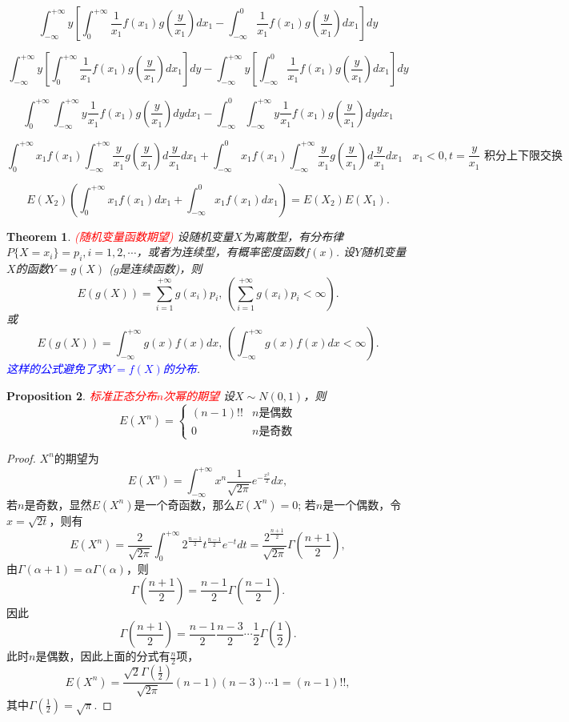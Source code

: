 \documentclass{article}
\newtheorem{theorem}{Theorem}[section]
\newtheorem{proposition}[theorem]{Proposition}
\newcommand{\redt}[1]{\textcolor{red}{#1}}
\newcommand{\bluet}[1]{\textcolor{blue}{#1}}
\begin{document}

$$
\int_{-\infty}^{+\infty}y \left[\int_0^{+\infty} \frac{1}{x_1}f(x_1)g(\frac{y}{x_1})dx_1 - \int_{-\infty}^0 \frac{1}{x_1}f(x_1)g(\frac{y}{x_1})dx_1 \right]dy
$$

$$
\int_{-\infty}^{+\infty}y \left[\int_0^{+\infty} \frac{1}{x_1}f(x_1)g(\frac{y}{x_1})dx_1\right]dy - \int_{-\infty}^{+\infty}y\left[\int_{-\infty}^0 \frac{1}{x_1}f(x_1)g(\frac{y}{x_1})dx_1 \right]dy
$$

$$
\int_0^{+\infty}\int_{-\infty}^{+\infty} y\frac{1}{x_1}f(x_1)g(\frac{y}{x_1})dydx_1 - \int_{-\infty}^0\int_{-\infty}^{+\infty} y\frac{1}{x_1}f(x_1)g(\frac{y}{x_1})dydx_1
$$

$$
\int_0^{+\infty}x_1f(x_1)\int_{-\infty}^{+\infty}\frac{y}{x_1}g(\frac{y}{x_1})d\frac{y}{x_1}dx_1 + \int_{-\infty}^0x_1f(x_1)\int_{-\infty}^{+\infty} \frac{y}{x_1}g(\frac{y}{x_1})d\frac{y}{x_1}dx_1 ~~~~ \text{$x_1 < 0, t=\frac{y}{x_1}$ 积分上下限交换}
$$

$$
E(X_2)\left(\int_0^{+\infty}x_1f(x_1)dx_1 +\int_{-\infty}^0x_1f(x_1)dx_1\right) = E(X_2)E(X_1).
$$


\begin{theorem}
\rm \redt{(随机变量函数期望)} 设随机变量$X$为离散型，有分布律$P\{X=x_i\}=p_i,i=1,2,\cdots$，或者为连续型，有概率密度函数$f(x)$. 设$Y$随机变量$X$的函数$Y=g(X)$ ($g$是连续函数)，则
$$
E(g(X))=\sum\limits_{i=1}^{+\infty}g(x_i)p_i,\,\left(\sum\limits_{i=1}^{+\infty}g(x_i)p_i < \infty \right) .
$$
或
$$
E(g(X)) = \int_{-\infty}^{+\infty}g(x)f(x)dx,\, \left(\int_{-\infty}^{+\infty}g(x)f(x)dx < \infty\right).
$$
\bluet{这样的公式避免了求$Y=f(X)$的分布}.
\end{theorem}

\begin{proposition}
\rm \redt{标准正态分布$n$次幂的期望} 设$X \sim N(0,1)$，则
$$
E(X^n) = \left\{  \begin{array}{ll}
(n-1)!! & n\text{是偶数} \\
0	& n\text{是奇数} 
\end{array} \right.
$$
\end{proposition}

\begin{proof}
$X^n$的期望为
$$
E(X^n) = \int_{-\infty}^{+\infty} x^n \frac{1}{\sqrt{2\pi}}e^{-\frac{x^2}{2}}dx,
$$
若$n$是奇数，显然$E(X^n)$是一个奇函数，那么$E(X^n)=0$; 若$n$是一个偶数，令$x=\sqrt{2t}$，则有
$$
E(X^n) = \frac{2}{\sqrt{2\pi}} \int_{0}^{+\infty} 2^{\frac{n-1}{2}}t^{\frac{n-1}{2}}e^{-t}dt = \frac{2^{\frac{n+1}{2}}}{\sqrt{2\pi}} \Gamma(\frac{n+1}{2}),
$$
由$\Gamma(\alpha+1) = \alpha \Gamma(\alpha)$，则
$$
\Gamma(\frac{n+1}{2}) = \frac{n-1}{2}\Gamma(\frac{n-1}{2}).
$$
因此
$$
\Gamma(\frac{n+1}{2}) = \frac{n-1}{2} \frac{n-3}{2}\cdots \frac{1}{2}\Gamma(\frac{1}{2}). 
$$
此时$n$是偶数，因此上面的分式有$\frac{n}{2}$项，
$$
E(X^n) =\frac{\sqrt{2}\Gamma(\frac{1}{2})}{\sqrt{2\pi}}(n-1)(n-3)\cdots 1 =  (n-1)!!,
$$
其中$\Gamma(\frac{1}{2}) = \sqrt{\pi}$. 
\end{proof}
\end{document}
